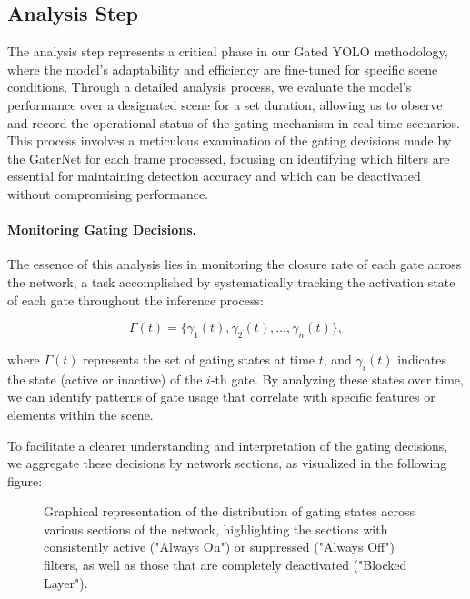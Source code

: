 \subsection{Analysis Step}

The analysis step represents a critical phase in our Gated YOLO methodology, where the model's adaptability and efficiency are fine-tuned for specific scene conditions. Through a detailed analysis process, we evaluate the model's performance over a designated scene for a set duration, allowing us to observe and record the operational status of the gating mechanism in real-time scenarios. This process involves a meticulous examination of the gating decisions made by the GaterNet for each frame processed, focusing on identifying which filters are essential for maintaining detection accuracy and which can be deactivated without compromising performance.

\paragraph{Monitoring Gating Decisions.} The essence of this analysis lies in monitoring the closure rate of each gate across the network, a task accomplished by systematically tracking the activation state of each gate throughout the inference process:

\begin{equation}
\Gamma(t) = \{\gamma_{1}(t), \gamma_{2}(t), \ldots, \gamma_{n}(t)\},
\label{eq:gating_states_time}
\end{equation}

where \(\Gamma(t)\) represents the set of gating states at time \(t\), and \(\gamma_{i}(t)\) indicates the state (active or inactive) of the \(i\)-th gate. By analyzing these states over time, we can identify patterns of gate usage that correlate with specific features or elements within the scene.

To facilitate a clearer understanding and interpretation of the gating decisions, we aggregate these decisions by network sections, as visualized in the following figure:

\begin{figure}[htbp]
\centering

\caption{Graphical representation of the distribution of gating states across various sections of the network, highlighting the sections with consistently active ("Always On") or suppressed ("Always Off") filters, as well as those that are completely deactivated ("Blocked Layer").}
\label{fig:gating_analysis}
\end{figure}

